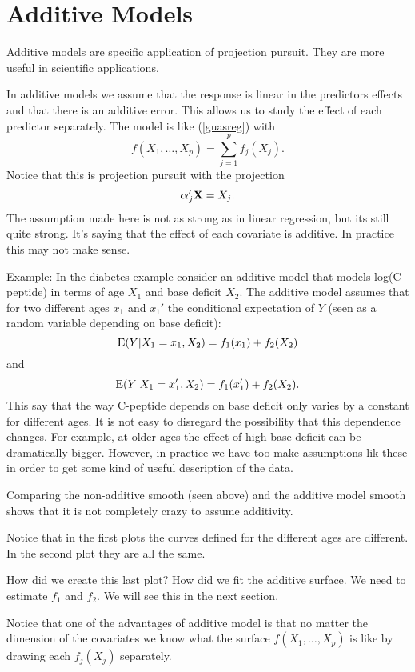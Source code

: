 \section{Additive Models}
Additive models are specific application of projection pursuit. They
are more useful in scientific applications.

In additive models we assume that the response is linear in the
predictors effects and that there is an additive error. This allows us to study the effect of each
predictor separately. The model is like (\ref{guasreg}) with
\[
f(X_1,\dots,X_p) = \sum_{j=1}^p f_j(X_j).
\]
Notice that this is projection pursuit with the projection
\[
\mbox{\boldmath $\alpha$\unboldmath}_j'{\mathbf X} = X_j.
\]
The assumption made here is not as strong as in linear regression, but
its still quite strong. It's saying that the effect of each covariate
is additive. In practice this may not make sense.

Example: In the diabetes example consider an additive model that
models log(C-peptide)
in terms of age  $X_1$ and base deficit $X_2$. The additive
model assumes that for two
different ages $x_1$ and $x_1'$ the conditional expectation of $Y$
(seen as a random variable depending on base deficit):
\[
\mbox{E}(Y | X_1=x_1, X_2) = f_1(x_1) + f_2(X_2) 
\]
and
\[
\mbox{E}(Y | X_1=x_1', X_2) = f_1(x_1') + f_2(X_2).
\]
This say that the way C-peptide depends on base deficit only varies by a
constant for different ages. It is not easy to disregard the
possibility that this dependence changes. For example, at
older ages the effect of high base deficit can be dramatically bigger. However,
in practice we have too make assumptions lik these in order to get
some kind of useful description of the data. 

Comparing the non-additive smooth (seen above) and the additive model
smooth shows that it is not completely crazy to assume
additivity. 

\centerline{}

Notice that in the first plots the curves defined for the different
ages are different. In the second plot they are all the same.

How did we create this last plot? How did we fit the additive
surface. We need to estimate $f_1$ and $f_2$. We will see this in the
next section.

Notice that one of the advantages of additive model is that no matter
the dimension of the covariates we know what the surface
$f(X_1,\dots,X_p)$ is like by drawing each $f_j(X_j)$ separately.


